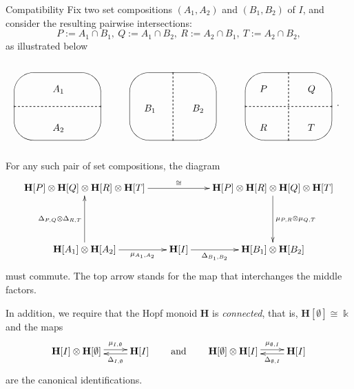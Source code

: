 \documentclass[ALCO,ThmDefs,Unicode,epreuves]{cedram}
\newenvironment{compatibility}{\begin{enonce*}[remark]{Compatibility}}{\end{enonce*}}
\def\field{\Bbbk}
\newcommand{\bH}{\mathbf{H}}
\newcommand{\qqand}{\qquad\text{and}\qquad}
\begin{document}

\begin{compatibility}
Fix two set compositions $(A_1,A_2)$ and $(B_1,B_2)$ of $I$,
and consider the resulting pairwise intersections:
\[
P:=A_1\cap B_1,\ Q:=A_1\cap B_2,\ R:=A_2\cap B_1,\ T:=A_2\cap B_2,
\]
as illustrated below
\begin{equation}\label{e:4sets}
\begin{gathered}
\quad \begin{picture}(100,90)(20,0)
 \put(50,40){\oval(90,70)}
 \put(5,40){\dashbox{2}(90,0){}}
 \put(45,55){$A_1$}
 \put(45,15){$A_2$}
\end{picture}
\quad
\begin{picture}(100,90)(10,0)
 \put(50,40){\oval(90,70)}
 \put(50,5){\dashbox{2}(0,70){}}
 \put(20,35){$B_1$}
 \put(70,35){$B_2$}
\end{picture}
\quad
\begin{picture}(100,90)(0,0)
\put(50,40){\oval(90,70)}
 \put(5,40){\dashbox{2}(90,0){}}
 \put(50,5){\dashbox{2}(0,70){}}
 \put(20,55){$P$}
 \put(70,55){$Q$}
 \put(20,15){$R$}
 \put(70,15){$T$}
\end{picture}
\end{gathered}.
\end{equation}

For any such pair of set compositions, the diagram
\begin{equation}\label{e:comp}
\begin{gathered}
\xymatrix@R+2pc@C-5pt{
\bH[P] \otimes \bH[Q] \otimes \bH[R] \otimes \bH[T] \ar[rr]^{\cong} & &
\bH[P] \otimes \bH[R] \otimes \bH[Q] \otimes \bH[T] \ar[d]^{\mu_{P,R}
\otimes \mu_{Q,T}}\\
\bH[A_1] \otimes \bH[A_2] \ar[r]_-{\mu_{A_1,A_2}}\ar[u]^{\Delta_{P,Q} \otimes
\Delta_{R,T}} & \bH[I] \ar[r]_-{\Delta_{B_1,B_2}} & \bH[B_1] \otimes
\bH[B_2]
}
\end{gathered}
\end{equation}
must commute. The top arrow stands for the map that interchanges the middle factors.

In addition, we require that the Hopf monoid $\bH$ is \emph{connected}, that is,
 $\bH[\emptyset]\cong\field$ and the maps
\[
\xymatrix{
\bH[I]\otimes\bH[\emptyset] \ar@<0.5ex>[r]^-{\mu_{I,\emptyset}} & 
\bH[I] \ar@<0.5ex>[l]^-{\Delta_{I,\emptyset}} 
}
\qqand
\xymatrix{
\bH[\emptyset]\otimes\bH[I] \ar@<0.5ex>[r]^-{\mu_{\emptyset,I}} & 
\bH[I] \ar@<0.5ex>[l]^-{\Delta_{\emptyset,I}} 
}
\]
are the canonical identifications.


\end{compatibility}
\end{document}
